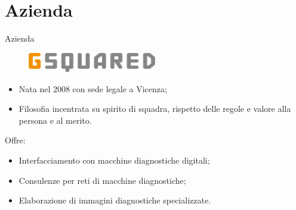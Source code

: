 \documentclass{beamer}
\begin{document}
	
	\section{Azienda}
	\begin{frame}{Azienda} 
	
	\begin{figure}[ht]
    	\centering
    	\includegraphics[width=0.5\textwidth]{Images/logo-azienda.png}
	\end{figure}	
	
	\begin{itemize}
		\item Nata nel 2008 con sede legale a Vicenza;
		\item Filosofia incentrata su spirito di squadra, rispetto delle regole e valore alla persona e al merito.
	\end{itemize}
	
	Offre:
	\begin{itemize}
		\item Interfacciamento con macchine diagnostiche digitali;
		\item Consulenze per reti di macchine diagnostiche;
		\item Elaborazione di immagini diagnostiche specializzate.
	\end{itemize}
	
	
	\end{frame}
	
	
\end{document}
